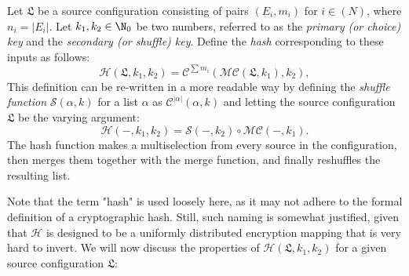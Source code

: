 \documentclass[12pt, a4paper]{article}
\renewcommand{\C}{\mathcal{C}}
\renewcommand{\H}{\mathcal{H}}
\renewcommand{\S}{\mathcal{S}}
\newcommand{\M}{\mathcal{M}}
\newcommand{\conf}{\mathfrak{L}}
\begin{document}
\begin{definition}
    Let $ \conf $ be a source configuration consisting of pairs $ (E_i, m_i) $ for $ i \in (N) $, where $ n_i = |E_i| $. Let $ k_1, k_2 \in \N_0 $ be two numbers, referred to as the \emph{primary (or choice) key} and the \emph{secondary (or shuffle) key}. Define the \emph{hash} corresponding to these inputs as follows:
    \[ \H(\conf, k_1, k_2) = \C^{\sum m_i}\left(\M\C(\conf, k_1), k_2\right), \]
    This definition can be re-written in a more readable way by defining the \emph{shuffle function} $ \S(\alpha, k) $ for a list $ \alpha $ as $ \C^{|\alpha|}(\alpha, k) $ and letting the source configuration $ \conf $ be the varying argument:
    \[ \H(-, k_1, k_2) = \S(-, k_2) \circ \M\C(-, k_1). \]
    The hash function makes a multiselection from every source in the configuration, then merges them together with the merge function, and finally reshuffles the resulting list.
\end{definition}

Note that the term "hash" is used loosely here, as it may not adhere to the formal definition of a cryptographic hash. Still, such naming is somewhat justified, given that $ \H $ is designed to be a uniformly distributed encryption mapping that is very hard to invert. We will now discuss the properties of $ \H(\conf, k_1, k_2) $ for a given source configuration $ \conf $:
\end{document}
